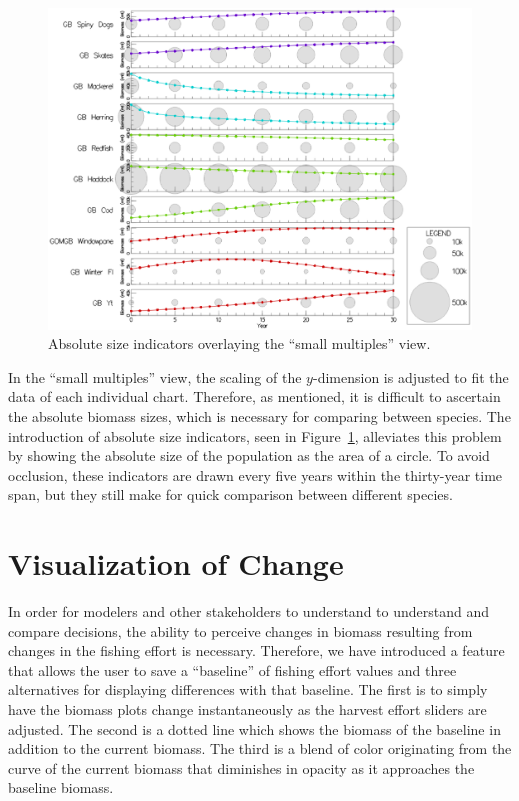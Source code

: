 \begin{figure}[h]
	\centering
	\includegraphics[width=12cm]{figures/eps/msprod_abssize.eps}
	\caption{Absolute size indicators overlaying the ``small multiples'' view.}
	\label{fig:msprod_abssize}
\end{figure}

In the ``small multiples'' view, the scaling of the $y$-dimension is adjusted to fit the data of each individual chart.  Therefore, as mentioned, it is difficult to ascertain the absolute biomass sizes, which is necessary for comparing between species.  The introduction of absolute size indicators, seen in Figure~\ref{fig:msprod_abssize}, alleviates this problem by showing the absolute size of the population as the area of a circle.  To avoid occlusion, these indicators are drawn every five years within the thirty-year time span, but they still make for quick comparison between different species.

\section{Visualization of Change}

In order for modelers and other stakeholders to understand to understand and compare decisions, the ability to perceive changes in biomass resulting from changes in the fishing effort is necessary.  Therefore, we have introduced a feature that allows the user to save a ``baseline'' of fishing effort values and three alternatives for displaying differences with that baseline.  The first is to simply have the biomass plots change instantaneously as the harvest effort sliders are adjusted.  The second is a dotted line which shows the biomass of the baseline in addition to the current biomass.  The third is a blend of color originating from the curve of the current biomass that diminishes in opacity as it approaches the baseline biomass.

